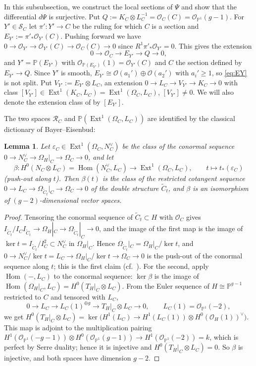 \documentclass[11pt,reqno]{amsart}
\theoremstyle{plain}
\newtheorem{lemma}[theorem]{Lemma}
\theoremstyle{definition}
\newcommand{\PP}{\mathbb{P}}
\newcommand{\OO}{\mathcal{O}}
\newcommand{\Hom}{\operatorname{Hom}}
\newcommand{\Ext}{\operatorname{Ext}}
\newcommand{\Ct}{\widetilde{C}}
\newcommand{\SC}{\mathcal{S}_C}
\newcommand{\RC}{\mathcal{R}_C}
\begin{document}
In this subsubsection, we construct the local sections of $\Psi$ and show that the differential $d\Psi$ is surjective.
Put $Q:=K_C\otimes L_C^{-1}=\OO_C(C)=\OO_{\PP^1}(g-1)$. For $Y'\in\SC$ let $\pi'\colon Y'\to C$ be the ruling for which $C$ is a section and $E_{Y'}:=\pi'_*\OO_{Y'}(C)$. Pushing forward we have $0\to\OO_{Y'}\to\OO_{Y'}(C)\to\OO_C(C)\to0$ since $R^1\pi'_*\OO_{Y'}=0$. This gives the extension
\begin{equation}\label{eq:EY}
0\to\OO_C\to E_{Y'}\to Q\to0,
\end{equation}
and $Y'=\PP(E_{Y'})$ with $\OO_{\PP(E_{Y'})}(1)=\OO_{Y'}(C)$ and $C$ the section defined by $E_{Y'}\to Q$. Since $Y'$ is smooth, $E_{Y'}\cong\OO(a_1')\oplus\OO(a_2')$ with $a_i'\ge1$, so \eqref{eq:EY} is not split. Put $V_{Y'}:=E_{Y'}\otimes L_C$, an extension $0\to L_C\to V_{Y'}\to K_C\to0$ with class $[V_{Y'}]\in\Ext^1(K_C,L_C)=\Ext^1(\Omega_C,L_C)$, $[V_{Y'}]\ne0$. We will also denote the extension class of  by $[E_{Y'}]$.

The two spaces $\RC$ and $\PP(\Ext^1(\Omega_C,L_C))$ are identified by the classical dictionary of Bayer--Eisenbud:

\begin{lemma}\label{lem:beta}
Let $\varepsilon_C\in\Ext^1(\Omega_C,N_C^{\vee})$ be the class of the conormal sequence $0\to N_C^{\vee}\to\Omega_H|_C\to\Omega_C\to0$, and let
\[
\beta\colon H^0(N_C\otimes L_C)=\Hom(N_C^{\vee},L_C)\longrightarrow\Ext^1(\Omega_C,L_C),\qquad t\longmapsto t_*(\varepsilon_C)
\]
(push-out along $t$). Then $\beta(t)$ is the class of the restricted cotangent sequence $0\to L_C\to\Omega_{\Ct_t}|_C\to\Omega_C\to0$ of the double structure $\Ct_t$, and $\beta$ is an isomorphism of $(g-2)$-dimensional vector spaces.
\end{lemma}

\begin{proof}
Tensoring the conormal sequence of $\Ct_t\subset H$ with $\OO_C$ gives $I_{\Ct_t}/I_CI_{\Ct_t}\to\Omega_H|_C\to\Omega_{\Ct_t}|_C\to 0$, and the image of the first map is the image of $\ker t=I_{\Ct_t}/I_C^2\subset N_C^{\vee}$ in $\Omega_H|_C$. Hence $\Omega_{\Ct_t}|_C=\Omega_H|_C/\ker t$, and $0\to N_C^{\vee}/\ker t=L_C\to\Omega_H|_C/\ker t\to\Omega_C\to0$ is the push-out of the conormal sequence along $t$; this is the first claim (cf.\ \cite[Theorem~1.2]{BE95}). For the second, apply $\Hom(-,L_C)$ to the conormal sequence: $\ker\beta$ is the image of $\Hom(\Omega_H|_C,L_C)=H^0(T_H|_C\otimes L_C)$. From the Euler sequence of $H\cong\PP^{g-1}$ restricted to $C$ and tensored with $L_C$,
\[
0\to L_C\to L_C(1)^{\oplus g}\to T_H|_C\otimes L_C\to 0,\qquad L_C(1)=\OO_{\PP^1}(-2),
\]
we get $H^0(T_H|_C\otimes L_C)=\ker\big(H^1(L_C)\to H^1(L_C(1))\otimes H^0(\OO_H(1))^{\vee}\big)$. This map is adjoint to the multiplication pairing $H^1(\OO_{\PP^1}(-g-1))\otimes H^0(\OO_{\PP^1}(g-1))\to H^1(\OO_{\PP^1}(-2))=k$, which is perfect by Serre duality; hence it is injective and $H^0(T_H|_C\otimes L_C)=0$. So $\beta$ is injective, and both spaces have dimension $g-2$.
\end{proof}
\end{document}
